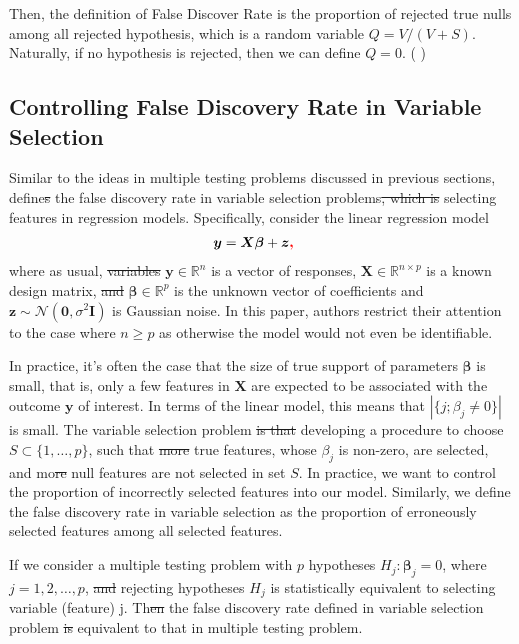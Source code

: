 \documentclass{uwstat572}
\newcommand{\vmdel}[1]{\sout{#1}}
\newcommand{\vmadd}[1]{\textbf{\color{red}{#1}}}
\newcommand{\vmcomment}[1]{({\color{blue}{VM's comment:}} \textbf{\color{blue}{#1}})}
\begin{document}
Then, the definition of False Discover Rate is the proportion of rejected true nulls among all rejected hypothesis, which is a random variable $Q = V/(V+S)$. Naturally, if no hypothesis is rejected, then we can define $Q = 0$. 
\vmcomment{Only vectors and matrices should be bolded.}

\subsection{Controlling False Discovery Rate in Variable Selection}
Similar to the ideas in multiple testing problems discussed in previous sections, \cite{barber2015controlling} define\vmdel{s} the false discovery rate in variable selection problems\vmdel{, which is} \vmadd{---} selecting features in regression models. Specifically, consider the linear regression model\vmadd{:}
\begin{align}\label{eq:1}
& \bm{y} = \bm{X}\bm{\beta}+\bm{z}\vmadd{,}
\end{align}
where as usual, \vmdel{variables} $\bm{y}\in\mathbb{R}^n$ is a vector of responses, $\bm{X}\in \mathbb{R}^{n\times p}$ is a known design matrix, \vmdel{and} $\bm{\beta}\in \mathbb{R}^p$ is the unknown vector of coefficients\vmadd{,} and $\bm{z}\sim \mathcal{N}(\bm{0}, \sigma^2\bm{I})$ is Gaussian noise. In this paper, \vmadd{the} authors restrict their attention to the case where $n\geq p$ as otherwise the model would not even be identifiable.

In practice, it's often the case that the size of true support of parameters $\bm{\beta}$ is small, that is, only a few features in $\bm{X}$ are expected to be associated with the outcome $\mathbf{y}$ of interest. In terms of the linear model, this means that $|\{j; \beta_j \neq 0 \}|$ is small. 
The variable selection problem \vmdel{is that} \vmadd{amounts to} developing a procedure to choose $S\subset\{1,\dots, p\}$, such that \vmdel{more} \vmadd{most} true features, whose $\beta_j$ is non-zero, are selected, and mo\vmdel{re}\vmadd{st} null features are not selected in set $S$. In practice, we want to control the proportion of incorrectly selected features into our model. Similarly, we define the false discovery rate in variable selection as the proportion of erroneously selected features among all selected features.

If we consider a multiple testing problem with $p$ hypotheses\vmadd{:} $H_j: \bm{\beta}_j = 0$, where $j=1,2,\dots,p$, \vmdel{and} \vmadd{then} rejecting hypotheses $H_j$ is statistically equivalent to selecting variable (feature) j. Th\vmdel{en}\vmadd{is makes} the false discovery rate defined in variable selection problem \vmdel{is} equivalent to that in multiple testing problem. 
\end{document}
